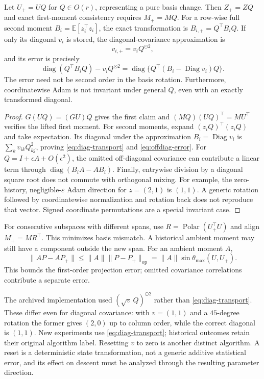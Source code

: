 \begin{lemma}
\label{lem:moments}
Let $U_+=UQ$ for $Q\in O(r)$, representing a pure basis change. Then
$Z_+=ZQ$ and exact first-moment consistency requires $M_+=MQ$.
For a row-wise full second moment $B_i=\mathbb E[z_i^\top z_i]$,
the exact transformation is $B_{i,+}=Q^\top B_iQ$. If only its diagonal
$v_i$ is stored, the diagonal-covariance approximation is
\begin{equation}
 v_{i,+}=v_i Q^{\odot2},\label{eq:diag-transport}
\end{equation}
and its error is precisely
\begin{equation}
 \operatorname{diag}(Q^\top B_iQ)-v_iQ^{\odot2}
 =\operatorname{diag}\{Q^\top(B_i-\operatorname{Diag}v_i)Q\}.
 \label{eq:offdiag-error}
\end{equation}
The error need not be second order in the basis rotation. Furthermore,
coordinatewise Adam is not invariant under general $Q$, even with an
exactly transformed diagonal.
\end{lemma}
\begin{proof}
$G(UQ)=(GU)Q$ gives the first claim and
$(MQ)(UQ)^\top=MU^\top$ verifies the lifted first moment.
For second moments, expand $(z_iQ)^\top(z_iQ)$ and take expectation.
Its diagonal under the approximation $B_i=\operatorname{Diag}v_i$ is
$\sum_k v_{ik}Q_{kj}^2$, proving \eqref{eq:diag-transport} and
\eqref{eq:offdiag-error}. For $Q=I+\epsilon A+O(\epsilon^2)$,
the omitted off-diagonal covariance can contribute a linear term through
$\operatorname{diag}(B_iA-AB_i)$.
Finally, entrywise division by a diagonal square root does not commute with
orthogonal mixing. For example, the zero-history, negligible-$\varepsilon$
Adam direction for $z=(2,1)$ is $(1,1)$. A generic rotation followed by
coordinatewise normalization and rotation back does not reproduce that
vector. Signed coordinate permutations are a special invariant case.
\end{proof}

For consecutive subspaces with different spans, use
$R=\operatorname{Polar}(U_+^\top U)$ and align $M_+=MR^\top$.
This minimizes basis mismatch. A historical ambient moment may still have
a component outside the new span. For an ambient moment $A$,
\begin{equation}
 \|AP-AP_+\|\le\|A\|\|P-P_+\|_{\mathrm{op}}
 =\|A\|\sin\theta_{\max}(U,U_+).
\end{equation}
This bounds the first-order projection error; omitted covariance
correlations contribute a separate error.

The archived implementation used $(\sqrt v\,Q)^{\odot2}$ rather than
\eqref{eq:diag-transport}. These differ even for diagonal covariance:
with $v=(1,1)$ and a $45$-degree rotation the former gives $(2,0)$ up to
column order, while the correct diagonal is $(1,1)$. New experiments use
\eqref{eq:diag-transport}; historical outcomes retain their original
algorithm label. Resetting $v$ to zero is another distinct algorithm. A
reset is a deterministic state transformation, not a generic additive
statistical error, and its effect on descent must be analyzed through the
resulting parameter direction.
